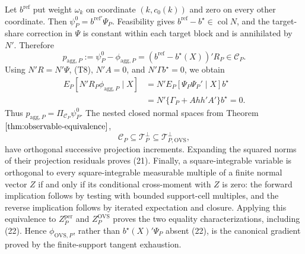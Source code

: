 Let \(b^{\mathrm{ref}}\) put weight \(\omega_k\) on coordinate \((k,c_0(k))\) and zero on every other coordinate.  Then \(\psi_P^0=b^{\mathrm{ref}\prime}\Psi_P\).  Feasibility gives \(b^{\mathrm{ref}}-b^\star\in\operatorname{col}N\), and the target-share correction in \(\Psi\) is constant within each target block and is annihilated by \(N'\).  Therefore
\[
p_{\mathrm{agg},P}:=\psi_P^0-\phi_{\mathrm{agg},P}
=(b^{\mathrm{ref}}-b^\star(X))'R_P\in\mathcal C_P.
\tag{T10}
\]
Using \(N'R=N'\Psi\), (T8), \(N'A=0\), and \(N'\Gamma b^\star=0\), we obtain
\[
\begin{aligned}
E_P[N'R_P\phi_{\mathrm{agg},P}\mid X]
&=N'E_P[\Psi_P\Psi_P'\mid X]b^\star\\
&=N'\{\Gamma_P+Ahh'A'\}b^\star=0.
\end{aligned}
\tag{T11}
\]
Thus \(p_{\mathrm{agg},P}=\Pi_{\mathcal C_P}\psi_P^0\).  The nested closed normal spaces from Theorem \(\ref{thm:observable-equivalence}\),
\[
\mathcal C_P\subseteq\mathcal T_P^\perp
\subseteq\mathcal T_{P,\mathrm{OVS}}^\perp,
\]
have orthogonal successive projection increments.  Expanding the squared norms of their projection residuals proves (21).  Finally, a square-integrable variable is orthogonal to every square-integrable measurable multiple of a finite normal vector \(Z\) if and only if its conditional cross-moment with \(Z\) is zero: the forward implication follows by testing with bounded support-cell multiples, and the reverse implication follows by iterated expectation and closure.  Applying this equivalence to \(Z_P^{\mathrm{per}}\) and \(Z_P^{\mathrm{OVS}}\) proves the two equality characterizations, including (22).  Hence \(\phi_{\mathrm{OVS},P}\), rather than \(b^\star(X)'\Psi_P\) absent (22), is the canonical gradient proved by the finite-support tangent exhaustion.

